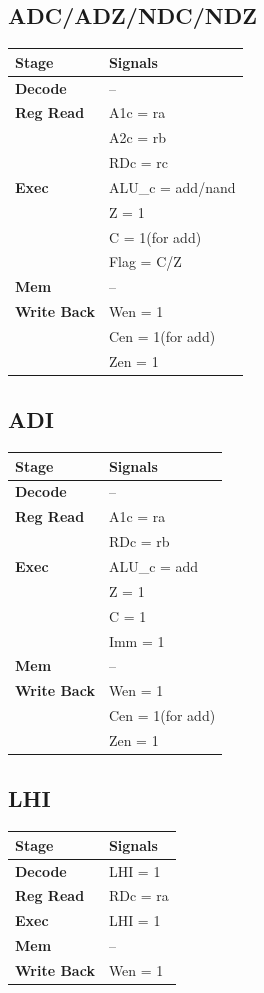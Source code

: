 \documentclass{article}
\begin{document}
\subsection*{ADC/ADZ/NDC/NDZ}
\begin{tabular}{|l|l|}
\hline
\textbf{Stage} & \textbf{Signals}\\
\hline
\textbf{Decode} & --\\
\hline
\textbf{Reg Read} & A1c = ra \\
                  & A2c = rb \\
                  & RDc = rc \\ 
\hline
\textbf{Exec} & ALU\_c = add/nand\\
              & Z = 1\\
              & C = 1(for add)\\
              & Flag = C/Z\\
\hline
\textbf{Mem} & --\\
\hline
\textbf{Write Back} & Wen = 1\\
                    & Cen = 1(for add)\\
                    & Zen = 1\\
\hline
\end{tabular}

\subsection*{ADI}
\begin{tabular}{|l|l|}
\hline
\textbf{Stage} & \textbf{Signals}\\
\hline
\textbf{Decode} & --\\
\hline
\textbf{Reg Read} & A1c = ra\\
                  & RDc = rb\\
\hline
\textbf{Exec} & ALU\_c = add\\
              & Z = 1\\
              & C = 1\\
              & Imm = 1\\
\hline
\textbf{Mem} & --\\
\hline
\textbf{Write Back} & Wen = 1\\
                    & Cen = 1(for add)\\
                    & Zen = 1\\
\hline
\end{tabular}

\subsection*{LHI}
\begin{tabular}{|l|l|}
\hline
\textbf{Stage} & \textbf{Signals}\\
\hline
\textbf{Decode} & LHI = 1\\
\hline
\textbf{Reg Read} & RDc = ra\\
\hline
\textbf{Exec} & LHI = 1\\
\hline
\textbf{Mem} & --\\
\hline
\textbf{Write Back} & Wen = 1\\
\hline
\end{tabular}
\end{document}

